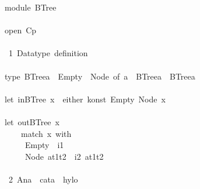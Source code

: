 \documentclass[a4paper]{article}
\begin{document}
\begin{tabbing}\ttfamily
~module~BTree\\
\ttfamily ~\\
\ttfamily ~open~Cp\\
\ttfamily ~\\
\ttfamily ~~1~Datatype~definition~\\
\ttfamily ~\\
\ttfamily ~type~BTreea~~Empty~~Node~of~a~~BTreea~~BTreea\\
\ttfamily ~\\
\ttfamily ~let~inBTree~x~~either~konst~Empty~Node~x\\
\ttfamily ~\\
\ttfamily ~let~outBTree~x~\\
\ttfamily ~~~~~match~x~with\\
\ttfamily ~~~~~~Empty~~i1\\
\ttfamily ~~~~~~Node~at1t2~~i2~at1t2\\
\ttfamily ~\\
\ttfamily ~~2~Ana~~cata~~hylo~\\
\ttfamily ~\\

\end{tabbing}
\end{document}
